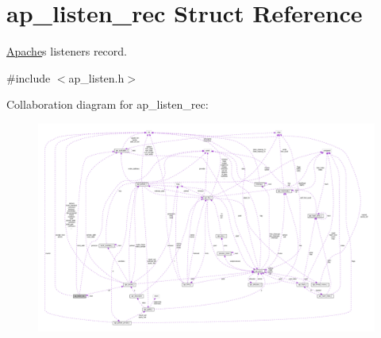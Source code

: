 \hypertarget{structap__listen__rec}{}\section{ap\+\_\+listen\+\_\+rec Struct Reference}
\label{structap__listen__rec}


\hyperlink{namespaceApache}{Apache}\textquotesingle{}s listeners record.  




{\ttfamily \#include $<$ap\+\_\+listen.\+h$>$}



Collaboration diagram for ap\+\_\+listen\+\_\+rec\+:
\nopagebreak
\begin{figure}[H]
\begin{center}
\leavevmode
\includegraphics[width=350pt]{structap__listen__rec__coll__graph}
\end{center}
\end{figure}
